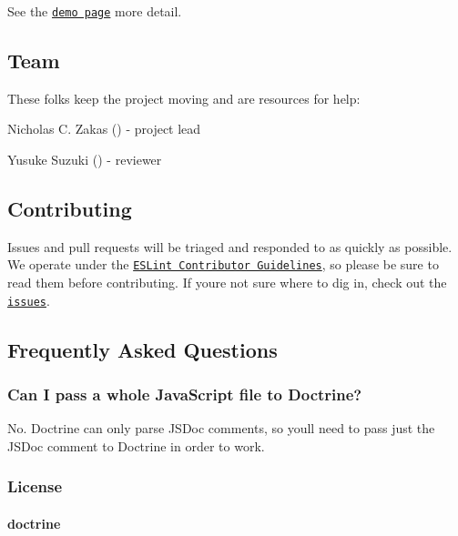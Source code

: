 See the \href{http://eslint.org/doctrine/demo/}{\tt demo page} more detail.

\subsection*{Team}

These folks keep the project moving and are resources for help\+:


\begin{DoxyItemize}
\item Nicholas C. Zakas (\href{https://github.com/nzakas}{\tt }) -\/ project lead
\item Yusuke Suzuki (\href{https://github.com/constellation}{\tt }) -\/ reviewer
\end{DoxyItemize}

\subsection*{Contributing}

Issues and pull requests will be triaged and responded to as quickly as possible. We operate under the \href{http://eslint.org/docs/developer-guide/contributing}{\tt E\+S\+Lint Contributor Guidelines}, so please be sure to read them before contributing. If you\textquotesingle{}re not sure where to dig in, check out the \href{https://github.com/eslint/doctrine/issues}{\tt issues}.

\subsection*{Frequently Asked Questions}

\subsubsection*{Can I pass a whole Java\+Script file to Doctrine?}

No. Doctrine can only parse J\+S\+Doc comments, so you\textquotesingle{}ll need to pass just the J\+S\+Doc comment to Doctrine in order to work.

\subsubsection*{License}

\paragraph*{doctrine}

